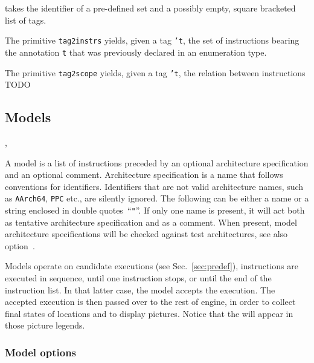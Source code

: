 \begin{center}
\T{[}  \T{]}
\end{center}

takes the identifier of a pre-defined set and a possibly empty, square bracketed
list of tags.

The primitive {\tt tag2instrs} yields, given a tag {\tt 't}, the set of
instructions bearing the annotation {\tt t} that was previously declared in an
enumeration type.

The primitive {\tt tag2scope} yields, given a tag {\tt 't}, the relation
between instructions TODO

\subsection{\label{language:model}Models}
\begin{syntax}
 \is \boption {} \eoption \boption {} \eoption \brepet {} \erepet
\sep
{} \is {} \orelse  {}
\end{syntax}
A model is a list of instructions preceded by an optional architecture
specification and an optional comment.
Architecture specification is a name that follows  \herd{} conventions for identifiers. Identifiers that are not valid architecture names, such as \texttt{AArch64}, \texttt{PPC} etc., are silently ignored.
The following  can be either a name or a string enclosed in double quotes~``\verb+"+''.
If only one name is present, it will act both as tentative architecture specification and as a comment.
When present, model architecture specifications will be checked against test architectures, see also option~.


Models operate on candidate executions
(see Sec.~\ref{sec:predef}),
instructions are executed in sequence,
until one instruction stops, or until the end of the instruction list.
In that latter case, the model accepts the execution.
The accepted execution is then passed over to the rest of \herd{}
engine, in order to collect final states of locations
and to display pictures. Notice that the  will appear
in those picture legends.

\iffalse
\subsubsection*{Model options}

